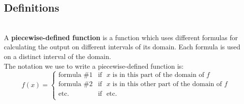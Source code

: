 \newpage

\subsection*{Definitions} \label{def-functions-piecewise}

\begin{myDefinition}~\\[0.5mm]
A {\bf piecewise-defined function} is a function which uses different formulas for calculating the output on different intervals of its domain.  Each formula is used on a distinct interval of the domain.  \\

The notation we use to write a piecewise-defined function is:
\[
	f(x)=
	\begin{cases}
		\text{formula \#1}	&	\textrm{if}\ 	\ \	\text{$x$ is in this part of the domain of $f$}		\\
		\text{formula \#2}	&	\textrm{if}\ 	\ \	\text{$x$ is in this other part of the domain of $f$}		\\
		\text{etc.}			&	\textrm{if}\ 	\ \	\text{etc.}		\\
	\end{cases}
\]


\end{myDefinition}
